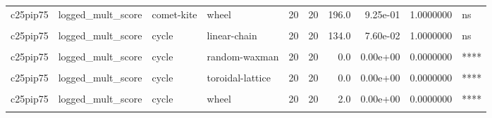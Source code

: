\documentclass[
]{book}
\begin{document}
\begin{table}
\begin{tabular}{l|l|l|l|r|r|r|r|r|l}
\hline
\cellcolor{gray!6}{c25pip75} & \cellcolor{gray!6}{logged\_mult\_score} & \cellcolor{gray!6}{comet-kite} & \cellcolor{gray!6}{well-mixed} & \cellcolor{gray!6}{20} & \cellcolor{gray!6}{20} & \cellcolor{gray!6}{2.0} & \cellcolor{gray!6}{0.00e+00} & \cellcolor{gray!6}{0.0000000} & \cellcolor{gray!6}{****}\\
\hline
c25pip75 & logged\_mult\_score & comet-kite & wheel & 20 & 20 & 196.0 & 9.25e-01 & 1.0000000 & ns\\
\hline
\cellcolor{gray!6}{c25pip75} & \cellcolor{gray!6}{logged\_mult\_score} & \cellcolor{gray!6}{comet-kite} & \cellcolor{gray!6}{windmill} & \cellcolor{gray!6}{20} & \cellcolor{gray!6}{20} & \cellcolor{gray!6}{159.0} & \cellcolor{gray!6}{2.77e-01} & \cellcolor{gray!6}{1.0000000} & \cellcolor{gray!6}{ns}\\
\hline
c25pip75 & logged\_mult\_score & cycle & linear-chain & 20 & 20 & 134.0 & 7.60e-02 & 1.0000000 & ns\\
\hline
\cellcolor{gray!6}{c25pip75} & \cellcolor{gray!6}{logged\_mult\_score} & \cellcolor{gray!6}{cycle} & \cellcolor{gray!6}{random-barabasi-albert} & \cellcolor{gray!6}{20} & \cellcolor{gray!6}{20} & \cellcolor{gray!6}{0.0} & \cellcolor{gray!6}{0.00e+00} & \cellcolor{gray!6}{0.0000000} & \cellcolor{gray!6}{****}\\
\hline
c25pip75 & logged\_mult\_score & cycle & random-waxman & 20 & 20 & 0.0 & 0.00e+00 & 0.0000000 & ****\\
\hline
\cellcolor{gray!6}{c25pip75} & \cellcolor{gray!6}{logged\_mult\_score} & \cellcolor{gray!6}{cycle} & \cellcolor{gray!6}{star} & \cellcolor{gray!6}{20} & \cellcolor{gray!6}{20} & \cellcolor{gray!6}{400.0} & \cellcolor{gray!6}{0.00e+00} & \cellcolor{gray!6}{0.0000000} & \cellcolor{gray!6}{****}\\
\hline
c25pip75 & logged\_mult\_score & cycle & toroidal-lattice & 20 & 20 & 0.0 & 0.00e+00 & 0.0000000 & ****\\
\hline
\cellcolor{gray!6}{c25pip75} & \cellcolor{gray!6}{logged\_mult\_score} & \cellcolor{gray!6}{cycle} & \cellcolor{gray!6}{well-mixed} & \cellcolor{gray!6}{20} & \cellcolor{gray!6}{20} & \cellcolor{gray!6}{0.0} & \cellcolor{gray!6}{0.00e+00} & \cellcolor{gray!6}{0.0000000} & \cellcolor{gray!6}{****}\\
\hline
c25pip75 & logged\_mult\_score & cycle & wheel & 20 & 20 & 2.0 & 0.00e+00 & 0.0000000 & ****\\
\hline
\cellcolor{gray!6}{c25pip75} & \cellcolor{gray!6}{logged\_mult\_score} & \cellcolor{gray!6}{cycle} & \cellcolor{gray!6}{windmill} & \cellcolor{gray!6}{20} & \cellcolor{gray!6}{20} & \cellcolor{gray!6}{0.0} & \cellcolor{gray!6}{0.00e+00} & \cellcolor{gray!6}{0.0000000} & \cellcolor{gray!6}{****}\\

\end{tabular}
\end{table}
\end{document}
